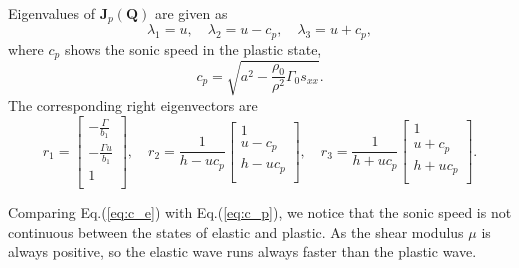 \documentclass{article}
\numberwithin{equation}{section}
\numberwithin{table}{section}
\begin{document}
Eigenvalues of $\mathbf{J}_p(\mathbf{Q})$ are given as
$$\lambda_1 = u,\quad \lambda_2 = u-c_p, \quad \lambda_3 = u+c_p,$$
where $c_p$ shows the sonic speed in the plastic state,  
\begin{equation}\label{eq:c_p}
   c_p = \sqrt{a^2-\frac{\rho_0}{\rho^2}\Gamma_0 s_{xx}}.
\end{equation}
The corresponding right eigenvectors are
\begin{equation}\label{eq:eivp}
  r_1 = \left[ \begin{array}{l}
	  -\frac{\Gamma}{b_1} \\
	  -\frac{\Gamma u}{b_1} \\
	  1\\
  \end{array}\right], \quad
  r_2 = \frac{1}{h-uc_p} \left[  \begin{array}{l}
	  1 \\
	  u-c_p \\
	  h-uc_p\\
  \end{array}\right], \quad
 r_3 = \frac{1}{h+uc_p}\left[ \begin{array}{l}
	  1 \\
	  u+c_p \\
	  h+uc_p\\
  \end{array}\right].
\end{equation}

Comparing Eq.(\ref{eq:c_e}) with Eq.(\ref{eq:c_p}), we notice that the sonic speed is not continuous between the states of elastic and plastic. As the shear modulus $\mu$ is always positive, so the elastic wave runs always faster than the plastic wave.  %
\end{document}
